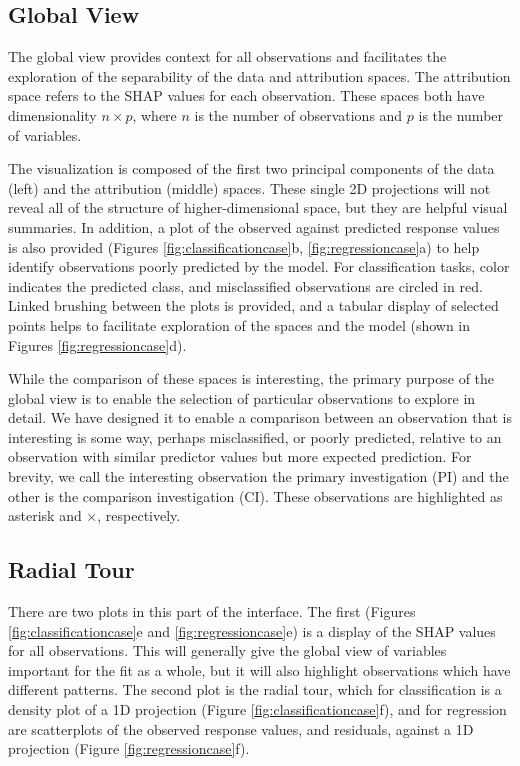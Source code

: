 \documentclass[
]{jss}
\begin{document}
\hypertarget{global-view}{%
\subsection{Global View}\label{global-view}}

The global view provides context for all observations and facilitates the exploration of the separability of the data and attribution spaces. The attribution space refers to the SHAP values for each observation. These spaces both have dimensionality \(n \times p\), where \(n\) is the number of observations and \(p\) is the number of variables.

The visualization is composed of the first two principal components of the data (left) and the attribution (middle) spaces. These single 2D projections will not reveal all of the structure of higher-dimensional space, but they are helpful visual summaries. In addition, a plot of the observed against predicted response values is also provided (Figures \ref{fig:classificationcase}b, \ref{fig:regressioncase}a) to help identify observations poorly predicted by the model. For classification tasks, color indicates the predicted class, and misclassified observations are circled in red. Linked brushing between the plots is provided, and a tabular display of selected points helps to facilitate exploration of the spaces and the model (shown in Figures \ref{fig:regressioncase}d).

While the comparison of these spaces is interesting, the primary purpose of the global view is to enable the selection of particular observations to explore in detail. We have designed it to enable a comparison between an observation that is interesting is some way, perhaps misclassified, or poorly predicted, relative to an observation with similar predictor values but more expected prediction. For brevity, we call the interesting observation the primary investigation (PI) and the other is the comparison investigation (CI). These observations are highlighted as asterisk and \(\times\), respectively.

\hypertarget{radial-tour}{%
\subsection{Radial Tour}\label{radial-tour}}

There are two plots in this part of the interface. The first (Figures \ref{fig:classificationcase}e and \ref{fig:regressioncase}e) is a display of the SHAP values for all observations. This will generally give the global view of variables important for the fit as a whole, but it will also highlight observations which have different patterns. The second plot is the radial tour, which for classification is a density plot of a 1D projection (Figure \ref{fig:classificationcase}f), and for regression are scatterplots of the observed response values, and residuals, against a 1D projection (Figure \ref{fig:regressioncase}f).
\end{document}

